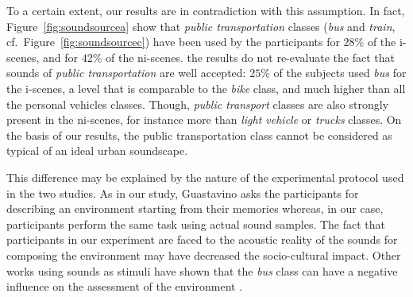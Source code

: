 \documentclass[preprint,12pt]{elsarticle}
\newcommand{\cf}{cf.}
\begin{document}
To a certain extent, our results are in contradiction with this assumption. In fact,  Figure~\ref{fig:soundsourcea} show that \emph{public transportation} classes (\emph{bus} and \emph{train}, \cf~Figure~\ref{fig:soundsourcec}) have been used by the participants for $28\%$ of the i-scenes, and for $42\%$ of the ni-scenes. the results do not re-evaluate the fact that sounds of \emph{public transportation} are well accepted: $25\%$ of the subjects used \emph{bus} for the i-scenes, a level that is comparable to the \emph{bike} class, and much higher than all the personal vehicles classes. Though, \emph{public transport} classes are also strongly present in the ni-scenes, for instance more than \emph{light vehicle} or \emph{trucks} classes. On the basis of our results, the public transportation class cannot be considered as typical of an ideal urban soundscape.

This difference may be explained by the nature of the experimental protocol used in the two studies. As in our study, Guastavino asks the participants for describing an environment starting from their memories whereas, in our case, participants perform the same task using actual sound samples. The fact that participants in our experiment are faced to the acoustic reality of the sounds for composing the environment may have decreased the socio-cultural impact. Other works using sounds as stimuli have shown that the \emph{bus} class can have a negative influence on the assessment of the environment \cite{lavandier2006contribution}.
\end{document}
